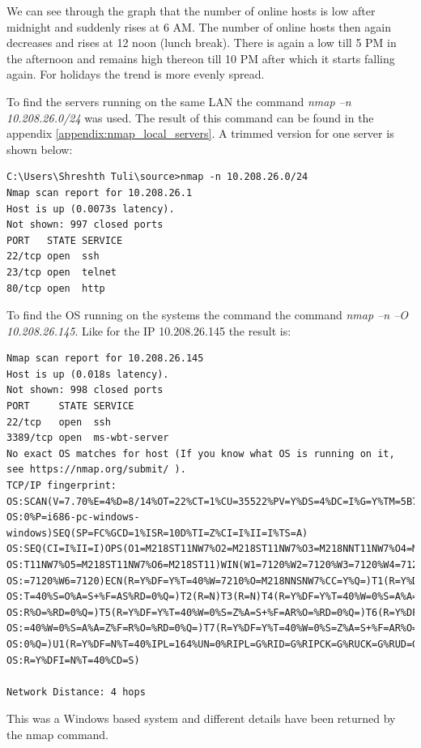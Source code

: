 \documentclass[a4paper, 11pt]{article}
\begin{document}
We can see through the graph that the number of online hosts is low after midnight and suddenly rises at 6 AM. The number of online hosts then again decreases and rises at 12 noon (lunch break). There is again a low till 5 PM in the afternoon and remains high thereon till 10 PM after which it starts falling again. For holidays the trend is more evenly spread.

To find the servers running on the same LAN the command \textit{nmap –n 10.208.26.0/24} was used. The result of this command can be found in the appendix \ref{appendix:nmap_local_servers}. A trimmed version for one server is shown below:

\begin{lstlisting}[style=BashInputStyle]
C:\Users\Shreshth Tuli\source>nmap -n 10.208.26.0/24
Nmap scan report for 10.208.26.1
Host is up (0.0073s latency).
Not shown: 997 closed ports
PORT   STATE SERVICE
22/tcp open  ssh
23/tcp open  telnet
80/tcp open  http
\end{lstlisting}

To find the OS running on the systems the command the command \textit{nmap –n –O 10.208.26.145}. Like for the IP 10.208.26.145 the result is:

\begin{lstlisting}[style=BashInputStyle]
Nmap scan report for 10.208.26.145
Host is up (0.018s latency).
Not shown: 998 closed ports
PORT     STATE SERVICE
22/tcp   open  ssh
3389/tcp open  ms-wbt-server
No exact OS matches for host (If you know what OS is running on it, see https://nmap.org/submit/ ).
TCP/IP fingerprint:
OS:SCAN(V=7.70%E=4%D=8/14%OT=22%CT=1%CU=35522%PV=Y%DS=4%DC=I%G=Y%TM=5B72825
OS:0%P=i686-pc-windows-windows)SEQ(SP=FC%GCD=1%ISR=10D%TI=Z%CI=I%II=I%TS=A)
OS:SEQ(CI=I%II=I)OPS(O1=M218ST11NW7%O2=M218ST11NW7%O3=M218NNT11NW7%O4=M218S
OS:T11NW7%O5=M218ST11NW7%O6=M218ST11)WIN(W1=7120%W2=7120%W3=7120%W4=7120%W5
OS:=7120%W6=7120)ECN(R=Y%DF=Y%T=40%W=7210%O=M218NNSNW7%CC=Y%Q=)T1(R=Y%DF=Y%
OS:T=40%S=O%A=S+%F=AS%RD=0%Q=)T2(R=N)T3(R=N)T4(R=Y%DF=Y%T=40%W=0%S=A%A=Z%F=
OS:R%O=%RD=0%Q=)T5(R=Y%DF=Y%T=40%W=0%S=Z%A=S+%F=AR%O=%RD=0%Q=)T6(R=Y%DF=Y%T
OS:=40%W=0%S=A%A=Z%F=R%O=%RD=0%Q=)T7(R=Y%DF=Y%T=40%W=0%S=Z%A=S+%F=AR%O=%RD=
OS:0%Q=)U1(R=Y%DF=N%T=40%IPL=164%UN=0%RIPL=G%RID=G%RIPCK=G%RUCK=G%RUD=G)IE(
OS:R=Y%DFI=N%T=40%CD=S)

Network Distance: 4 hops
\end{lstlisting}

This was a Windows based system and different details have been returned by the nmap command.
\end{document}
